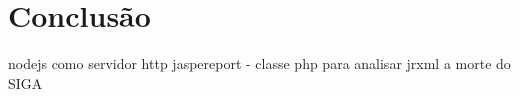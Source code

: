 \chapter{Conclusão}\label{cap:conclusao}

nodejs como servidor http
jaspereport - classe php para analisar jrxml
a morte do SIGA
